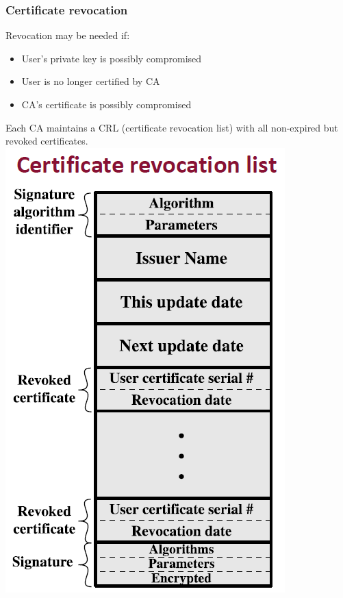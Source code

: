 \documentclass[12pt]{article}
\begin{document}
 \subsubsection{Certificate revocation}
 
\begin{multicols}{2}
	Revocation may be needed if:
	\begin{itemize}
		\item User's private key is possibly compromised
		\item User is no longer certified by CA
		\item CA's certificate is possibly compromised
	\end{itemize}
	Each CA maintains a CRL (certificate revocation list) with all non-expired but revoked certificates. \\
	\includegraphics[width=\linewidth]{./slides/L5P5CRL.PNG}
\end{multicols}
\end{document}

